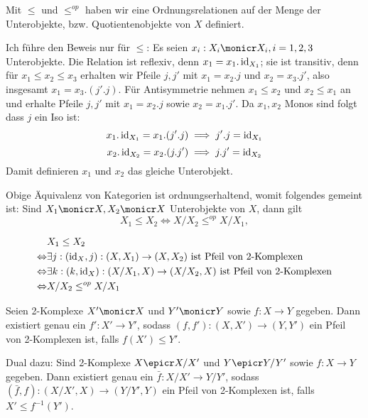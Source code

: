 \begin{lemm}
Mit $\leq$ und $\leq^{op}$ haben wir eine Ordnungsrelationen auf der Menge der Unterobjekte, bzw. Quotientenobjekte von $X$ definiert.
\end{lemm}
\begin{bew}
Ich führe den Beweis nur für $\leq$:
Es seien $x_i : X_i \monicr X_i, i=1,2,3$ Unterobjekte.
Die Relation ist reflexiv, denn $x_1 = x_1.\operatorname{id}_{X_1}$; sie ist transitiv, denn für $x_1 \leq x_2 \leq x_3$ erhalten wir Pfeile $j,j'$ mit $x_1 = x_2.j$ und $x_2 = x_3.j'$, also insgesamt $x_1 = x_3.(j'.j)$.
Für Antisymmetrie nehmen $x_1 \leq x_2$ und $x_2 \leq x_1$ an und erhalte Pfeile $j,j'$ mit $x_1 = x_2.j$ sowie $x_2 = x_1.j'$. Da $x_1,x_2$ Monos sind folgt dass $j$ ein Iso ist:
\[ x_1 . \operatorname{id}_{X_1} = x_1.(j'.j) \implies j'.j = \operatorname{id}_{X_1} \]
\[ x_2 . \operatorname{id}_{X_2} = x_2.(j.j') \implies j.j' = \operatorname{id}_{X_2} \]
Damit definieren $x_1$ und $x_2$ das gleiche Unterobjekt.

\end{bew}

\begin{korr}\label{antitonic}
Obige Äquivalenz von Kategorien ist ordnungserhaltend, womit folgendes gemeint ist: Sind $X_1 \monicr X, X_2 \monicr X$ Unterobjekte von $X$, dann gilt
\[ X_1 \leq X_2 \Leftrightarrow X/X_2 \leq^{op} X/X_1, \]
\end{korr}
\begin{bew}
\begin{align*}
                 & X_1 \leq X_2
\\\Leftrightarrow& \exists j : (\operatorname{id}_X,j) : (X,X_1) \to (X,X_2) \text{ ist Pfeil von 2-Komplexen}
\\\Leftrightarrow& \exists k : (k,\operatorname{id}_X) : (X/X_1,X) \to (X/X_2,X) \text{ ist Pfeil von 2-Komplexen}
\\\Leftrightarrow& X/X_2 \leq^{op} X/X_1
\end{align*}
\end{bew}


\begin{prop}
Seien 2-Komplexe $X' \monicr X$ und $Y' \monicr Y$ sowie $f : X \to Y$ gegeben. Dann existiert genau ein $f' : X' \to Y'$, sodass $(f,f') : (X,X') \to (Y,Y')$ ein Pfeil von 2-Komplexen ist, falls $f(X') \leq Y'$.

Dual dazu: Sind 2-Komplexe $X \epicr X/X'$ und $Y \epicr Y/Y'$ sowie $f : X\to Y$ gegeben. Dann existiert genau ein $\bar f : X/X' \to Y/Y'$, sodass $(\bar f, f) : (X/X',X) \to (Y/Y',Y)$ ein Pfeil von 2-Komplexen ist, falls $X' \leq f^{-1}(Y')$.
\end{prop}
